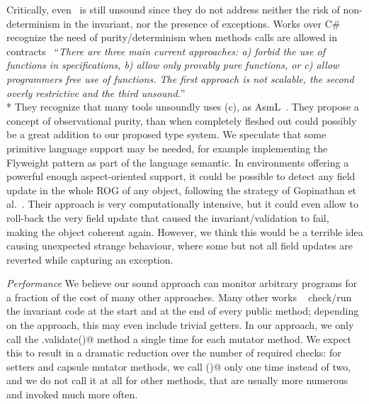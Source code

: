 Critically, even~\cite{Gopinathan:2008:RMO:1483018.1483028} is still unsound since they do not address neither
the risk of non-determinism in the invariant, 
nor the presence of exceptions.
\sepItems
Works over C\# recognize the need
of purity/determinism when methods calls are allowed in contracts~\cite{barnett200499}
``\emph{There are three main current approaches: a) forbid the use of functions in specifications, b) allow only provably pure functions, or c) allow programmers free use
of functions. The first approach is not scalable, the second overly restrictive and
the third unsound.}''\\*
They recognize that many tools unsoundly uses (c), as AsmL~\cite{barnett2003runtime}.
They propose a concept of observational purity, than when completely fleshed out
could possibly be a great addition to our proposed type system.
We speculate that some 
primitive language support may be needed, for example implementing the Flyweight pattern 
as part of the language semantic.
\sepItems
In environments offering a powerful enough aspect-oriented support,
it could be possible to detect any field update in the whole ROG of
any object, following the strategy of 
Gopinathan et al.~\cite{Gopinathan:2008:RMO:1483018.1483028}.
Their approach is very computationally intensive, but it could even allow to roll-back the very field update that caused 
the invariant/validation to fail, making the object coherent again.
However, we think this would be a terrible idea causing unexpected strange behaviour, where some but not all
field updates are reverted while capturing an exception.



\noindent\textit{Performance}
We believe our sound approach can monitor arbitrary programs
for a fraction of the cost of many other approaches.
Many other works%
~\cite{feldman2006jose,fahndrich2010embedded,abercrombie2002jcontractor,tran2003design}
 check/run
the invariant code at the start and at the end of every public
method; depending on the approach, this may even include trivial getters.
In  our approach,
we only call the \Q@.validate()@ method a single time for each mutator method.
We expect this to result in a dramatic reduction over
the number of required checks:
for setters and capsule mutator methods, we call \Q@validate()@ only one time instead of two,
and we do not call it at all for other methods, that are usually more numerous and invoked much more often.






